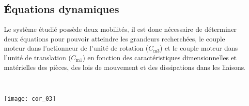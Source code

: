 \subsection{Équations dynamiques}

\ifprof
\else
Le système étudié possède deux mobilités, il est donc nécessaire de déterminer deux équations pour
pouvoir atteindre les grandeurs recherchées, le couple moteur dans l’actionneur de l’unité de rotation
($C_{\text{m3}}$) et le couple moteur dans l’unité de translation ($C_{\text{m1}}$) en fonction des caractéristiques
dimensionnelles et matérielles des pièces, des lois de mouvement et des dissipations dans les liaisons.
\fi


\ifprof
\begin{corrige}~\\
\begin{center} 
\texttt{[image: cor\_03]}
\end{center}
\end{corrige}
\else
\fi

